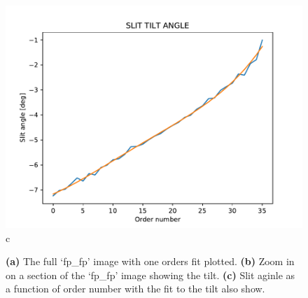 \begin{figure}
\begin{center}
\begin{minipage}{.495\textwidth}
\begin{center}
\includegraphics[width=\textwidth]{Figures/cal_SLIT_spirou_2.pdf}
c
\end{center}
\end{minipage}%
\end{center}

\caption{\textbf{(a)} The full `fp\_fp' image with one orders fit plotted. \textbf{(b)} Zoom in on a section of the `fp\_fp' image showing the tilt. \textbf{(c)} Slit aginle as a function of order number with the fit to the tilt also show. \label{figure:cal_SLIT_spirou}}
\end{figure}